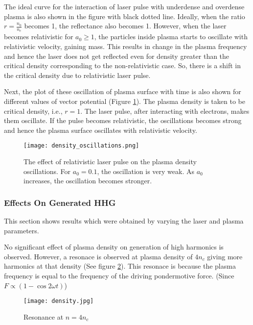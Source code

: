 The ideal curve for the interaction of laser pulse with underdense and overdense plasma is also shown in the figure with black dotted line. Ideally, when the ratio $r = \frac{n_0}{n_c}$ becomes 1, the reflectance also becomes 1. However, when the laser becomes relativistic for $a_0 \ge 1$, the particles inside plasma starts to oscillate with relativistic velocity, gaining mass. This results in change in the plasma frequency and hence the laser does not get reflected even for density greater than the critical density corresponding to the non-relativistic case. So, there is a shift in the critical density due to relativistic laser pulse.

Next, the plot of these oscillation of plasma surface with time is also shown for different values of vector potential (Figure \ref{fig:density_oscillations}). The plasma density is taken to be critical density, i.e., $r=1$. The laser pulse, after interacting with electrons, makes them oscillate. If the pulse becomes relativistic, the oscillations becomes strong and hence the plasma surface oscillates with relativistic velocity.



\begin{figure}[H]
    \centering
    \texttt{[image: density\_oscillations.png]}
    \caption{The effect of relativistic laser pulse on the plasma density oscillations. For $a_0=0.1$, the oscillation is very weak. As $a_0$ increases, the oscillation becomes stronger.}
    \label{fig:density_oscillations}
\end{figure}

\subsubsection{Effects On Generated HHG}
This section shows results which were obtained by varying the laser and plasma parameters.

No significant effect of plasma density on generation of high harmonics is observed. However, a resonace is observed at plasma density of $4n_c$ giving more harmonics at that density (See figure \ref{fig:density}). This resonace is because the plasma frequency is equal to the frequency of the driving pondermotive force. (Since $F\propto (1-\cos{2\omega t})$)

\begin{figure}[H]
    \centering
    \texttt{[image: density.jpg]}
    \caption{Resonance at $n = 4n_c$}
    \label{fig:density}
\end{figure}

